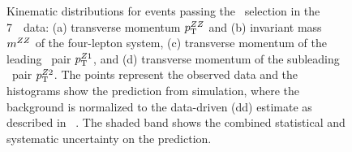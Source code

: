 \begin{figure}[htbp]
    \begin{center}
    \caption[Kinematic distributions for events passing the \ZZ\ selection in
    the 7~\tev\ data.]
    {Kinematic distributions for events passing the \ZZ\ selection in
    the 7~\tev\ data: (a) transverse momentum $p_{\mathrm{T}}^{ZZ}$ and (b) invariant mass $m^{ZZ}$ of the 
    four-lepton system, (c) transverse momentum of the leading
    \dilep\ pair $p_{\mathrm{T}}^{Z1}$, and (d) transverse momentum of the subleading
    \dilep\ pair $p_{\mathrm{T}}^{Z2}$. The points represent the observed data and the 
    histograms show the prediction from simulation, where the background
    is normalized to the data-driven (dd) estimate as described in
    ~. The shaded band 
    shows the combined statistical and systematic uncertainty on the prediction. 
    }
    \label{fig:zzdists-ZZ-seven}
    \end{center}
\end{figure}

